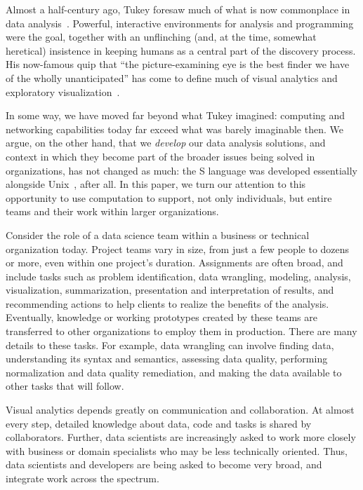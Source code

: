 
\maketitle

Almost a
half-century ago, Tukey foresaw
much of what is now commonplace in data analysis~\cite{TukeyFDA}.
Powerful, interactive environments for analysis and programming were
the goal, together with an unflinching (and, at the time, somewhat
heretical) insistence in keeping humans as a central part of the
discovery process. His now-famous quip that ``the picture-examining eye is the
best finder we have of the wholly unanticipated'' has come to define
much of visual analytics and exploratory visualization~\cite{TukeyEDA}.

In some way, we have moved far beyond what Tukey imagined:
computing and networking capabilities today far exceed
what was barely imaginable then. 
We argue, on the other hand, that we \emph{develop} our data analysis
solutions, and context in which they become part of the broader issues
being solved in organizations, has not changed as much: the S language
was developed essentially alongside Unix~\cite{TheSSystem}, after all.
In this paper, we turn our attention to this opportunity to use computation
to support, not only individuals, but entire teams and their
work within larger organizations.

Consider the role of a data science team within
a business or technical organization today.
Project teams vary in size, from just a few people to dozens or
more, even within one project's duration. Assignments are often
broad, and include tasks such as problem identification,
data wrangling, modeling, analysis, visualization, summarization,
presentation and interpretation of results, and recommending
actions to help clients to realize the benefits of the analysis.
Eventually, knowledge or working prototypes created by these teams
are transferred to other organizations to employ them in production.
There are many details to these tasks. For example, data wrangling can involve
finding data, understanding its syntax and semantics, assessing data quality,
performing normalization and data quality remediation, and making the data
available to other tasks that will follow.

Visual analytics depends greatly on communication and collaboration.
At almost every step, detailed knowledge about data, code and tasks
is shared by collaborators. 
Further, data scientists are increasingly asked to work more closely
with business or domain specialists who may be less technically oriented.
Thus, data scientists and developers are being asked to become
very broad, and integrate work across the spectrum.

